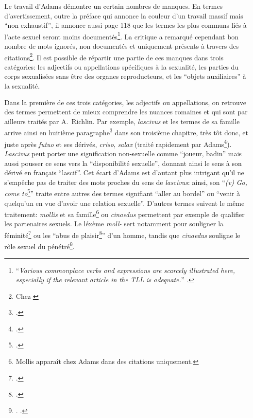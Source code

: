Le travail d'Adams démontre un certain nombres de manques. En termes d'avertissement, outre la préface qui annonce la couleur d'un travail massif mais \enquote{non exhaustif}, il annonce aussi page 118 que les termes les plus communs liés à l'acte sexuel seront moins documentés\footnote{\enquote{\textit{Various commonplace verbs and expressions are scarcely illustrated here, especially if the relevant article in the TLL is adequate.}} \textcite[p.~118]{adams}.}. La critique a remarqué cependant bon nombre de mots ignorés, non documentés et uniquement présents à travers des citations\footnote{Chez \textcite{rousselle_j_1987, richlin1984latin}}. Il est possible de répartir une partie de ces manques dans trois catégories: les adjectifs ou appellations spécifiques à la sexualité, les parties du corps sexualisées sans être des organes reproducteurs, et les \enquote{objets auxiliaires} à la sexualité.

Dans la première de ces trois catégories, les adjectifs ou appellations, on retrouve des termes permettent de mieux comprendre les nuances romaines et qui sont par ailleurs traités par A.~Richlin. Par exemple, \textit{lascivus} et les termes de sa famille arrive ainsi en huitième paragraphe\footcite[p.~147]{richlin_sexual_1978} dans son troisième chapitre, très tôt donc, et juste après \textit{futuo} et ses dérivés, \textit{criso}, \textit{salax} (traité rapidement par Adams\footcite[p.~206]{adams}). \textit{Lascivus} peut porter une signification non-sexuelle comme \enquote{joueur, badin} mais aussi pousser ce sens vers la \enquote{disponibilité sexuelle}, donnant ainsi le sens à son dérivé en français \enquote{lascif}. Cet écart d'Adams est d'autant plus intrigant qu'il ne s'empêche pas de traiter des mots proches du sens de \textit{lascivus}: ainsi, son \enquote{\textit{(v) Go, come to}\footcite[p.~175]{adams}} traite entre autres des termes signifiant \enquote{aller au bordel} ou \enquote{venir à quelqu'un en vue d'avoir une relation sexuelle}. D'autres termes suivent le même traitement: \textit{mollis} et sa famille\footnote{Mollis apparaît chez Adams dans des citations uniquement.} ou \textit{cinaedus} permettent par exemple de qualifier les partenaires sexuels. Le léxème \textit{moll-} sert notamment pour souligner la féminité\footcite{williams_meanings_2013} ou les \enquote{abus de plaisir\footcite[p.~320]{dupont_lerotisme_2001}} d'un homme, tandis que \textit{cinaedus} souligne le rôle sexuel du pénétré\footnote{\textcite[p.~142]{puccini_delbey_vie_2010}. \textcite[p.~275]{dupont_lerotisme_2001}.}.

